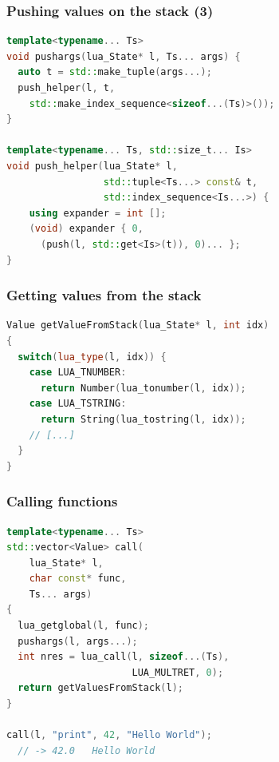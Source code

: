 \documentclass{beamer}
\begin{document}
\begin{frame}[fragile]
\begin{lstlisting}[language={C++}]
\end{lstlisting}
\end{frame}

\begin{frame}[fragile]
  \frametitle{Pushing values on the stack (3)}

  \begin{lstlisting}[language={C++}]
template<typename... Ts>
void pushargs(lua_State* l, Ts... args) {
  auto t = std::make_tuple(args...);
  push_helper(l, t,
    std::make_index_sequence<sizeof...(Ts)>());
}

template<typename... Ts, std::size_t... Is>
void push_helper(lua_State* l,
                 std::tuple<Ts...> const& t,
                 std::index_sequence<Is...>) {
    using expander = int [];
    (void) expander { 0,
      (push(l, std::get<Is>(t)), 0)... };
}
  \end{lstlisting}
\end{frame}


\begin{frame}[fragile]

  \frametitle{Getting values from the stack}

  \begin{lstlisting}[language={C++}]
Value getValueFromStack(lua_State* l, int idx)
{
  switch(lua_type(l, idx)) {
    case LUA_TNUMBER:
      return Number(lua_tonumber(l, idx));
    case LUA_TSTRING:
      return String(lua_tostring(l, idx));  
    // [...]  
  }
}
  \end{lstlisting}

\end{frame}


\begin{frame}[fragile]
  \frametitle{Calling functions}

  \begin{lstlisting}[language={C++}]
template<typename... Ts>
std::vector<Value> call(
    lua_State* l,
    char const* func,
    Ts... args)
{
  lua_getglobal(l, func);
  pushargs(l, args...);
  int nres = lua_call(l, sizeof...(Ts),
                      LUA_MULTRET, 0);
  return getValuesFromStack(l);  
}

call(l, "print", 42, "Hello World");
  // -> 42.0   Hello World
  \end{lstlisting}
    
\end{frame}
\end{document}
